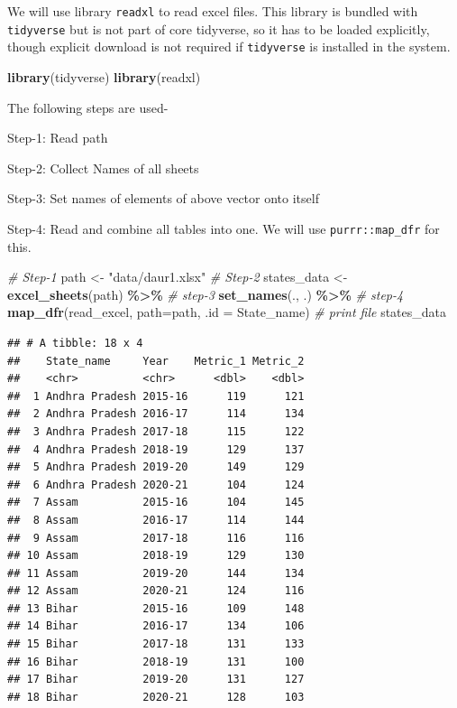 \documentclass[
]{book}
\newenvironment{Shaded}{\begin{snugshade}}{\end{snugshade}}
\newcommand{\AttributeTok}[1]{\textcolor[rgb]{0.13,0.29,0.53}{#1}}
\newcommand{\CommentTok}[1]{\textcolor[rgb]{0.56,0.35,0.01}{\textit{#1}}}
\newcommand{\FunctionTok}[1]{\textcolor[rgb]{0.13,0.29,0.53}{\textbf{#1}}}
\newcommand{\NormalTok}[1]{#1}
\newcommand{\OtherTok}[1]{\textcolor[rgb]{0.56,0.35,0.01}{#1}}
\newcommand{\SpecialCharTok}[1]{\textcolor[rgb]{0.81,0.36,0.00}{\textbf{#1}}}
\newcommand{\StringTok}[1]{\textcolor[rgb]{0.31,0.60,0.02}{#1}}
\begin{document}
We will use library \texttt{readxl} to read excel files. This library is bundled with \texttt{tidyverse} but is not part of core tidyverse, so it has to be loaded explicitly, though explicit download is not required if \texttt{tidyverse} is installed in the system.

\begin{Shaded}
\begin{Highlighting}[]
\FunctionTok{library}\NormalTok{(tidyverse)}
\FunctionTok{library}\NormalTok{(readxl)}
\end{Highlighting}
\end{Shaded}

The following steps are used-

Step-1: Read path

Step-2: Collect Names of all sheets

Step-3: Set names of elements of above vector onto itself

Step-4: Read and combine all tables into one. We will use \texttt{purrr::map\_dfr} for this.

\begin{Shaded}
\begin{Highlighting}[]
\CommentTok{\# Step{-}1}
\NormalTok{path }\OtherTok{\textless{}{-}} \StringTok{"data/daur1.xlsx"}
\CommentTok{\# Step{-}2}
\NormalTok{states\_data }\OtherTok{\textless{}{-}} \FunctionTok{excel\_sheets}\NormalTok{(path) }\SpecialCharTok{\%\textgreater{}\%} 
\CommentTok{\# step{-}3}
    \FunctionTok{set\_names}\NormalTok{(., .) }\SpecialCharTok{\%\textgreater{}\%} 
\CommentTok{\# step{-}4}
    \FunctionTok{map\_dfr}\NormalTok{(read\_excel, }\AttributeTok{path=}\NormalTok{path, }\AttributeTok{.id =} \StringTok{\textquotesingle{}State\_name\textquotesingle{}}\NormalTok{)}
\CommentTok{\# print file}
\NormalTok{states\_data}
\end{Highlighting}
\end{Shaded}

\begin{verbatim}
## # A tibble: 18 x 4
##    State_name     Year    Metric_1 Metric_2
##    <chr>          <chr>      <dbl>    <dbl>
##  1 Andhra Pradesh 2015-16      119      121
##  2 Andhra Pradesh 2016-17      114      134
##  3 Andhra Pradesh 2017-18      115      122
##  4 Andhra Pradesh 2018-19      129      137
##  5 Andhra Pradesh 2019-20      149      129
##  6 Andhra Pradesh 2020-21      104      124
##  7 Assam          2015-16      104      145
##  8 Assam          2016-17      114      144
##  9 Assam          2017-18      116      116
## 10 Assam          2018-19      129      130
## 11 Assam          2019-20      144      134
## 12 Assam          2020-21      124      116
## 13 Bihar          2015-16      109      148
## 14 Bihar          2016-17      134      106
## 15 Bihar          2017-18      131      133
## 16 Bihar          2018-19      131      100
## 17 Bihar          2019-20      131      127
## 18 Bihar          2020-21      128      103
\end{verbatim}
\end{document}
